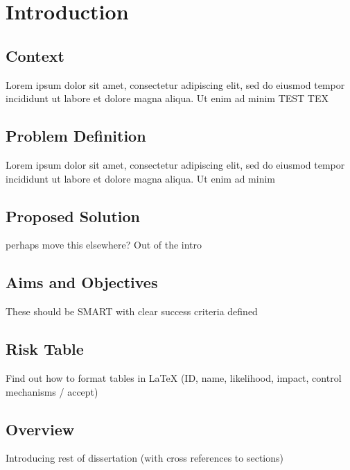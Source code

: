 \chapter{Introduction}
\label{introduction}

\section{Context}

  Lorem ipsum dolor sit amet, consectetur adipiscing elit, sed do eiusmod tempor incididunt ut labore et dolore magna aliqua. Ut enim ad minim
  TEST TEX
\section{Problem Definition}

  Lorem ipsum dolor sit amet, consectetur adipiscing elit, sed do eiusmod tempor incididunt ut labore et dolore magna aliqua. Ut enim ad minim

\section{Proposed Solution}
  perhaps move this elsewhere? Out of the intro

\section{Aims and Objectives}
  These should be SMART with clear success criteria defined

\section{Risk Table}
  Find out how to format tables in LaTeX
  (ID, name, likelihood, impact, control mechanisms / accept)

\section{Overview}
  Introducing rest of dissertation (with cross references to sections)
